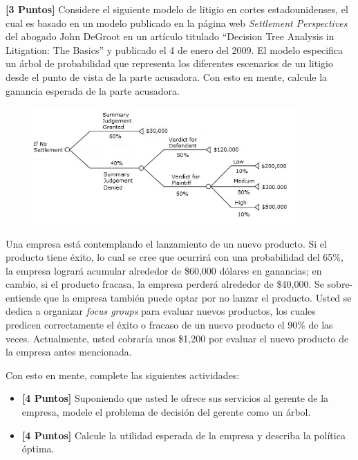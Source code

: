\documentclass[ a4paper, twoside, 11pt]{article}
\begin{document}
\begin{problem}
\textbf{[3 Puntos]} Considere el siguiente modelo de litigio en cortes estadounidenses, el cual es basado en un modelo publicado en la p\'agina web \emph{Settlement Perspectives} del abogado John DeGroot en un art\'iculo titulado ``Decision Tree Analysis in Litigation: The Basics'' y publicado el 4 de enero del 2009. El modelo especifica un \'arbol de probabilidad que representa los diferentes escenarios de un litigio desde el punto de vista de la parte acusadora. Con esto en mente, calcule la ganancia esperada de la parte acusadora. 

\begin{figure}[H]
\centering
\includegraphics[width=0.9\textwidth]{problema_arbol-recompensas.jpg}
\end{figure}

\end{problem}
\vspace{\baselineskip}

\begin{problem}
Una empresa est\'a contemplando el lanzamiento de un nuevo producto. Si el producto tiene \'exito, lo cual se cree que ocurrir\'a con una probabilidad del 65\%, la empresa lograr\'a acumular alrededor de \$60,000 d\'olares en ganancias; en cambio, si el producto fracasa, la empresa perder\'a alrededor de \$40,000. Se sobre-entiende que la empresa tambi\'en puede optar por no lanzar el producto. Usted se dedica a organizar \emph{focus groups} para evaluar nuevos productos, los cuales predicen correctamente el \'exito o fracaso de un nuevo producto el 90\% de las veces. Actualmente, usted cobrar\'ia unos \$1,200 por evaluar el nuevo producto de la empresa antes mencionada. 

Con esto en mente, complete las siguientes actividades: 
\begin{itemize}
\item \textbf{[4 Puntos]} Suponiendo que usted le ofrece sus servicios al gerente de la empresa, modele el problema de decisi\'on del gerente como un \'arbol. 
\item \textbf{[4 Puntos]} Calcule la utilidad esperada de la empresa y describa la pol\'itica \'optima. 
\end{itemize}

\end{problem}
\vspace{\baselineskip}
\end{document}
